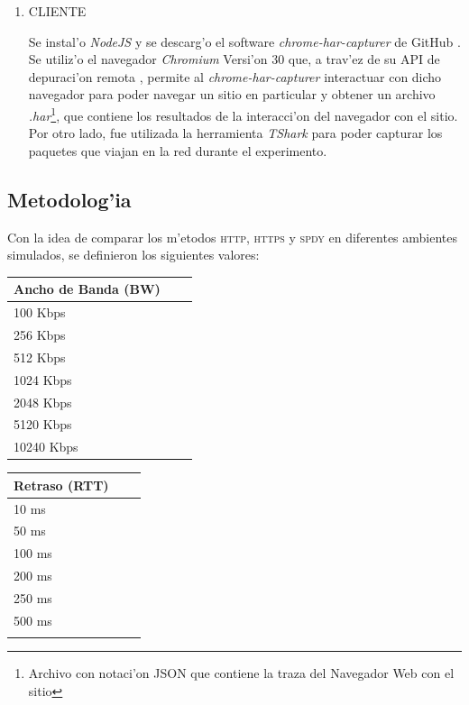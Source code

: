 \documentclass[a4paper,11pt,twocolumn]{article}
\begin{document}
\begin{enumerate}
\begin{quote}
firewall\_type=''OPEN''

gateway\_enable=''YES''
\end{quote}

Se configur'o el siguiente flag:
\begin{quote}\small
sysctl net.inet.ip.forwarding=1
\end{quote}
Y por 'ultimo, para que la Dummynet inicie junto con el Kernel del FreeBSD se agreg'o la siguiente l'inea en el archivo \emph{''/bot/loader.conf''}
\begin{quote}\small
dummynet\_load=''YES''
\end{quote}
\item CLIENTE

Se instal'o \emph{NodeJS} \cite{nodeJS} y se descarg'o el software \emph{chrome-har-capturer} \cite{harCapt} de GitHub \cite{github}.
Se utiliz'o el navegador \emph{Chromium} Versi'on 30 que, a trav'ez de su API de depuraci'on remota \cite{debuggingChrome}, permite al \emph{chrome-har-capturer} interactuar con dicho navegador para poder navegar un sitio en particular y obtener un archivo \emph{.har}\footnote{Archivo con notaci'on JSON \cite{json} que contiene la traza del Navegador Web con el sitio}, que contiene los resultados de la interacci'on del navegador con el sitio. Por otro lado, fue utilizada la herramienta \emph{TShark}\cite{tshark} para poder capturar los paquetes que viajan en la red durante el experimento.

\end{enumerate} 

\subsection{Metodolog'ia}
 \label{exp1meto}
Con la idea de comparar los m'etodos \textsc{http}, \textsc{https} y \textsc{spdy} en diferentes ambientes simulados, se definieron los siguientes valores:

\vspace*{1\baselineskip}
\begin{tabular}{ l c r }
	Ancho de Banda (BW)  \\ \hline
  	100 Kbps \\
	256 Kbps \\
	512 Kbps \\
	1024 Kbps \\
	2048 Kbps \\
	5120 Kbps \\
	10240 Kbps \\
\end{tabular}
\vspace*{1\baselineskip}
\begin{tabular}{ l c r }
	Retraso (RTT) \\ \hline
  	10 ms \\
	50 ms \\
	100 ms \\
	200 ms \\
	250 ms \\
	500 ms \\
	\\
\end{tabular}
\end{document}

